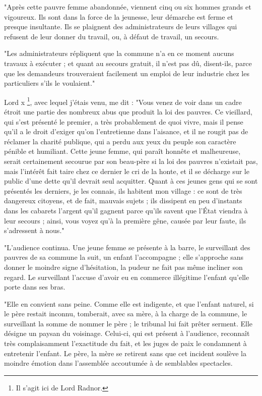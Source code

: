 \documentclass[french,twoside]{book} %
\begin{document}
"Après cette pauvre femme abandonnée, viennent cinq ou six hommes grands et vigoureux. Ils sont dans la force de la jeunesse, leur démarche est ferme et presque insultante. Ils se plaignent des administrateurs de leurs villages qui refusent de leur donner du travail, ou, à défaut de travail, un secours.\par
"Les administrateurs répliquent que la commune n’a en ce moment aucuns travaux à exécuter ; et quant au secours gratuit, il n’est pas dû, disent-ils, parce que les demandeurs trouveraient facilement un emploi de leur industrie chez les particuliers s’ils le voulaient."\par
Lord x \footnote{Il s’agit ici de Lord Radnor.}, avec lequel j’étais venu, me dit : "Vous venez de voir dans un cadre étroit une partie des nombreux abus que produit la loi des pauvres. Ce vieillard, qui s’est présenté le premier, a très probablement de quoi vivre, mais il pense qu’il a le droit d’exiger qu’on l’entretienne dans l’aisance, et il ne rougit pas de réclamer la charité publique, qui a perdu aux yeux du peuple son caractère pénible et humiliant. Cette jeune femme, qui paraît honnête et malheureuse, serait certainement secourue par son beau-père si la loi des pauvres n’existait pas, mais l’intérêt fait taire chez ce dernier le cri de la honte, et il se décharge sur le public d’une dette qu’il devrait seul acquitter. Quant à ces jeunes gens qui se sont présentés les derniers, je les connais, ils habitent mon village : ce sont de très dangereux citoyens, et de fait, mauvais sujets ; ils dissipent en peu d’instants dans les cabarets l’argent qu’il gagnent parce qu’ils savent que l’État viendra à leur secours ; ainsi, vous voyez qu’à la première gêne, causée par leur faute, ils s’adressent à nous."\par
"L'audience continua. Une jeune femme se présente à la barre, le surveillant des pauvres de sa commune la suit, un enfant l’accompagne ; elle s’approche sans donner le moindre signe d’hésitation, la pudeur ne fait pas même incliner son regard. Le surveillant l’accuse d’avoir eu en commerce illégitime l’enfant qu’elle porte dans ses bras.\par
"Elle en convient sans peine. Comme elle est indigente, et que l’enfant naturel, si le père restait inconnu, tomberait, avec sa mère, à la charge de la commune, le surveillant la somme de nommer le père ; le tribunal lui fait prêter serment. Elle désigne un paysan du voisinage. Celui-ci, qui est présent à l’audience, reconnaît très complaisamment l’exactitude du fait, et les juges de paix le condamnent à entretenir l’enfant. Le père, la mère se retirent sans que cet incident soulève la moindre émotion dans l’assemblée accoutumée à de semblables spectacles.\par
\end{document}
